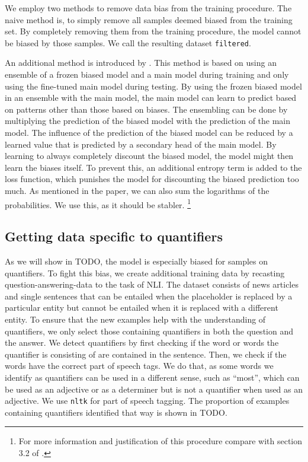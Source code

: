 We employ two methods to remove data bias from the training procedure. The naive method is, to simply remove all samples deemed biased from the training set. By completely removing them from the training procedure, the model cannot be biased by those samples. We call the resulting dataset \texttt{filtered}.

An additional method is introduced by \citet{ensemble}. This method is based on using an ensemble of a frozen biased model and a main model during training and only using the fine-tuned main model during testing. By using the frozen biased model in an ensemble with the main model, the main model can learn to predict based on patterns other than those based on biases. The ensembling can be done by multiplying the prediction of the biased model with the prediction of the main model. The influence of the prediction of the biased model can be reduced by a learned value that is predicted by a secondary head of the main model. By learning to always completely discount the biased model, the model might then learn the biases itself. To prevent this, an additional entropy term is added to the loss function, which punishes the model for discounting the biased prediction too much. As mentioned in the paper, we can also sum the logarithms of the probabilities. We use this, as it should be stabler. \footnote{For more information and justification of this procedure compare with section 3.2 of \cite{ensemble}.}

\subsection{Getting data specific to quantifiers} \label{sec:meth:recasting}

As we will show in TODO, the model is especially biased for samples on quantifiers. To fight this bias, we create additional training data by recasting question-answering-data to the task of \ac{NLI}. The dataset consists of news articles and single sentences that can be entailed when the placeholder is replaced by a particular entity but cannot be entailed when it is replaced with a different entity. To ensure that the new examples help with the understanding of quantifiers, we only select those containing quantifiers in both the question and the answer. We detect quantifiers by first checking if the word or words the quantifier is consisting of are contained in the sentence. Then, we check if the words have the correct part of speech tags. We do that, as some words we identify as quantifiers can be used in a different sense, such as \enquote{most}, which can be used as an adjective or as a determiner but is not a quantifier when used as an adjective. We use \texttt{nltk} \cite{nltk} for part of speech tagging. The proportion of examples containing quantifiers identified that way is shown in TODO.

